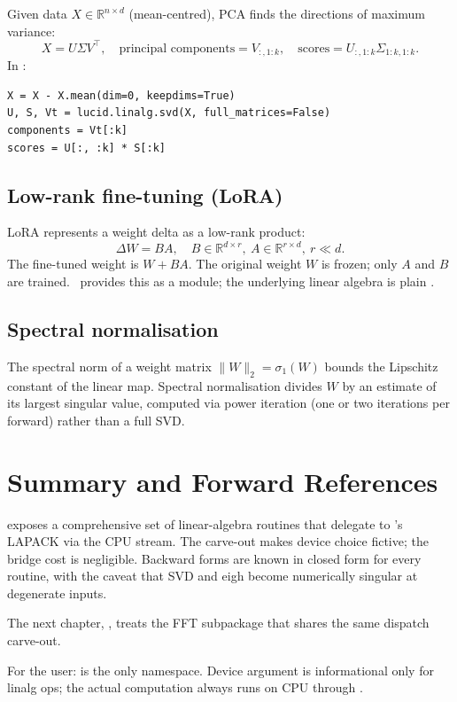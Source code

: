 Given data $X \in \mathbb{R}^{n \times d}$ (mean-centred), PCA
finds the directions of maximum variance:
\[
X = U \Sigma V^\top,
\quad \text{principal components} = V_{:,1:k},
\quad \text{scores} = U_{:,1:k} \Sigma_{1:k,1:k}.
\]
In \Lucid:
\begin{lstlisting}[style=lucid,language=LucidPython]
X = X - X.mean(dim=0, keepdims=True)
U, S, Vt = lucid.linalg.svd(X, full_matrices=False)
components = Vt[:k]
scores = U[:, :k] * S[:k]
\end{lstlisting}

\subsection{Low-rank fine-tuning (LoRA)}
\label{ssec:linalg:lora}

LoRA \cite{hu_lora_2021} represents a weight delta as a low-rank
product:
\[
\Delta W = B A, \quad B \in \mathbb{R}^{d \times r},\
A \in \mathbb{R}^{r \times d},\ r \ll d.
\]
The fine-tuned weight is $W + B A$. The original weight $W$ is
frozen; only $A$ and $B$ are trained. \Lucid\ provides this as
a module; the underlying linear algebra is plain .

\subsection{Spectral normalisation}
\label{ssec:linalg:spec_norm}

The spectral norm of a weight matrix $\|W\|_2 = \sigma_1(W)$
bounds the Lipschitz constant of the linear map. Spectral
normalisation \cite{miyato_specnorm_2018} divides $W$ by an
estimate of its largest singular value, computed via power
iteration (one or two iterations per forward) rather than a full
SVD.

\section{Summary and Forward References}
\label{sec:linalg:summary}

 exposes a comprehensive set of linear-algebra
routines that delegate to \Accelerate's LAPACK via the CPU
stream. The carve-out makes device choice fictive; the bridge
cost is negligible. Backward forms are known in closed form for
every routine, with the caveat that SVD and eigh become
numerically singular at degenerate inputs.

The next chapter, , treats the FFT subpackage that
shares the same dispatch carve-out.

\begin{lucidnote}
For the user:  is the only namespace. Device
argument is informational only for linalg ops; the actual
computation always runs on CPU through \Accelerate.
\end{lucidnote}
